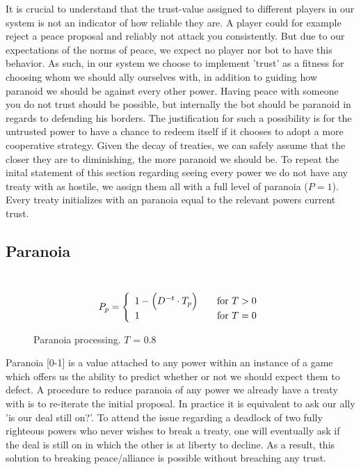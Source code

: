 \documentclass[a4paper]{article} %
\begin{document}
It is crucial to understand that the trust-value assigned to different players in our system is not an indicator of how reliable they are. A player could for example reject a peace proposal and reliably not attack you consistently. But due to our expectations of the norms of peace, we expect no player nor bot to have this behavior. As such, in our system we choose to implement 'trust' as a fitness for choosing whom we should ally ourselves with, in addition to guiding how paranoid we should be against every other power. Having peace with someone you do not trust should be possible, but internally the bot should be paranoid in regards to defending his borders. The justification for such a possibility is for the untrusted power to have a chance to redeem itself if it chooses to adopt a more cooperative strategy. Given the decay of treaties, we can safely assume that the closer they are to diminishing, the more paranoid we should be. To repeat the inital statement of this section regarding seeing every power we do not have any treaty with as hostile, we assign them all with a full level of paranoia ($P = 1$). Every treaty initializes with an paranoia equal to the relevant powers current trust. 

\subsection{Paranoia}
\
  \[ P_p = \left\{ 
  \begin{array}{l l}
    1 - \Big( D^{-t} \cdot T_p \Big) & \quad \text{for $T > 0$} \\
 	1 & \quad \text{for $T = 0$}
    
  \end{array} \right.\]
\begin{figure}[H]
\centering
{}
\caption{Paranoia processing. $T$ = 0.8}
\label{fig:graph2}
\end{figure}


Paranoia [0-1]  is a value attached to any power within an instance of a game which offers us the ability to predict whether or not we should expect them to defect. A procedure to reduce paranoia of any power we already have a treaty with is to re-iterate the initial proposal. In practice it is equivalent to ask our ally 'is our deal still on?'. To attend the issue regarding a deadlock of two fully righteous powers who never wishes to break a treaty, one will eventually ask if the deal is still on in which the other is at liberty to decline. As a result, this solution to breaking peace/alliance is possible without breaching any trust.
\end{document}
